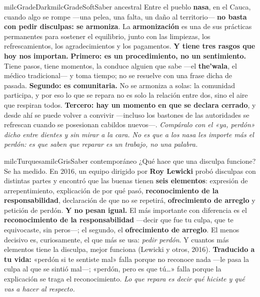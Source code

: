 \documentclass[11pt,letterpaper]{article}
\begin{document}
\begin{softbox}{milcGradeDark}{milcGradeSoft}{Saber ancestral}
Entre el pueblo \textbf{nasa}, en el Cauca, cuando algo se rompe ---una pelea, una falta, un daño al territorio--- \textbf{no basta con pedir disculpas: se armoniza}. La \textbf{armonización} es una de sus prácticas permanentes para sostener el equilibrio, junto con las limpiezas, los refrescamientos, los agradecimientos y los pagamentos. \textbf{Y tiene tres rasgos que hoy nos importan.} \textbf{Primero: es un procedimiento, no un sentimiento.} Tiene pasos, tiene momentos, la conduce alguien que sabe ---el \textbf{the'wala}, el médico tradicional--- y toma tiempo; no se resuelve con una frase dicha de pasada. \textbf{Segundo: es comunitaria.} No se armoniza a solas: la comunidad participa, y por eso lo que se repara no es solo la relación entre dos, sino el aire que respiran todos. \textbf{Tercero: hay un momento en que se declara cerrado}, y desde ahí se puede volver a convivir ---incluso los bastones de las autoridades se refrescan cuando se posesionan cabildos nuevos---. \emph{Compáralo con el «ya, perdón» dicho entre dientes y sin mirar a la cara. No es que a los nasa les importe más el perdón: es que saben que reparar es un trabajo, no una palabra.}
\end{softbox}

\begin{softbox}{milcTurquesa}{milcGris}{Saber contemporáneo}
¿Qué hace que una disculpa funcione? Se ha medido. En 2016, un equipo dirigido por \textbf{Roy Lewicki} probó disculpas con distintas partes y encontró que las buenas tienen \textbf{seis elementos}: expresión de arrepentimiento, explicación de por qué pasó, \textbf{reconocimiento de la responsabilidad}, declaración de que no se repetirá, \textbf{ofrecimiento de arreglo} y petición de perdón. \textbf{Y no pesan igual.} El más importante con diferencia es el \textbf{reconocimiento de la responsabilidad} ---decir que fue tu culpa, que te equivocaste, sin peros---; el segundo, el \textbf{ofrecimiento de arreglo}. El menos decisivo es, curiosamente, el que más se usa: \emph{pedir perdón}. Y cuantos más elementos tiene la disculpa, mejor funciona (Lewicki y otros, 2016). \textbf{Traducido a tu vida:} «perdón si te sentiste mal» falla porque no reconoce nada ---le pasa la culpa al que se sintió mal---; «perdón, pero es que tú\ldots» falla porque la explicación se traga el reconocimiento. \emph{Lo que repara es decir qué hiciste y qué vas a hacer al respecto.}
\end{softbox}
\end{document}
